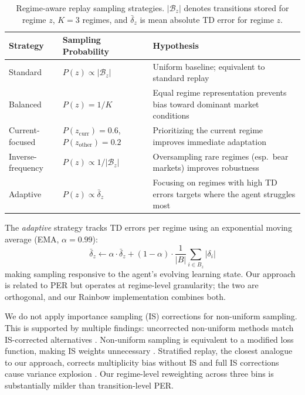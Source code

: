 \documentclass[11pt,a4paper]{article}
\begin{document}
\begin{table}[h]
\centering
\small
\caption{Regime-aware replay sampling strategies. $|\mathcal{B}_z|$ denotes transitions stored for regime $z$, $K=3$ regimes, and $\bar{\delta}_z$ is mean absolute TD error for regime $z$.}
\label{tab:strategies}
\begin{tabular}{@{}llp{5cm}@{}}
\toprule
\textbf{Strategy} & \textbf{Sampling Probability} & \textbf{Hypothesis} \\
\midrule
Standard & $P(z) \propto |\mathcal{B}_z|$ & Uniform baseline; equivalent to standard replay \\
Balanced & $P(z) = 1/K$ & Equal regime representation prevents bias toward dominant market conditions \\
Current-focused & $P(z_{\text{curr}}) = 0.6$, $P(z_{\text{other}}) = 0.2$ & Prioritizing the current regime improves immediate adaptation \\
Inverse-frequency & $P(z) \propto 1/|\mathcal{B}_z|$ & Oversampling rare regimes (esp.\ bear markets) improves robustness \\
Adaptive & $P(z) \propto \bar{\delta}_z$ & Focusing on regimes with high TD errors targets where the agent struggles most \\
\bottomrule
\end{tabular}
\end{table}

The \textit{adaptive} strategy tracks TD errors per regime using an exponential moving average (EMA, $\alpha = 0.99$):
\begin{equation}
    \bar{\delta}_z \leftarrow \alpha \cdot \bar{\delta}_z + (1 - \alpha) \cdot \frac{1}{|B|} \sum_{i \in B_z} |\delta_i|
\end{equation}
making sampling responsive to the agent's evolving learning state. Our approach is related to PER \citep{schaul2016per} but operates at regime-level granularity; the two are orthogonal, and our Rainbow implementation combines both.

We do not apply importance sampling (IS) corrections for non-uniform sampling. This is supported by multiple findings: uncorrected non-uniform methods match IS-corrected alternatives \citep{fedus2020replay}. Non-uniform sampling is equivalent to a modified loss function, making IS weights unnecessary \citep{fujimoto2020equivalence}. Stratified replay, the closest analogue to our approach, corrects multiplicity bias without IS \citep{daley2021stratified} and full IS corrections cause variance explosion \citep{munos2016retrace}. Our regime-level reweighting across three bins is substantially milder than transition-level PER.
\end{document}
